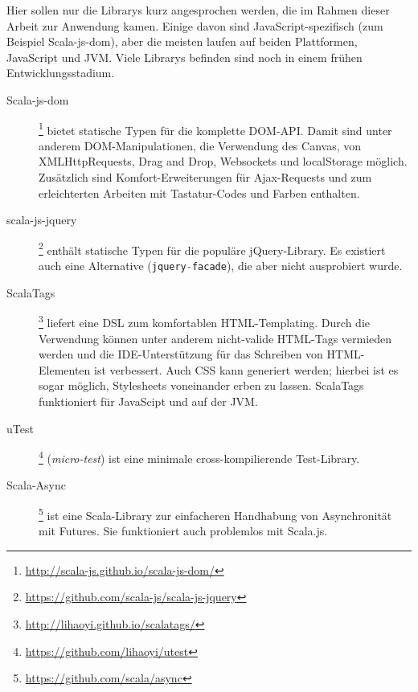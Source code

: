 \documentclass[a4paper, 12pt, hidelinks, listof=totoc, listoftables=totoc, bibliography=totoc]{scrreprt}
\newcommand{\code}[1]{\lstinline[language=Scala, style=inline]|#1|}
\begin{document}
Hier sollen nur die Librarys kurz angesprochen werden, die im Rahmen dieser Arbeit zur Anwendung kamen. Einige davon sind JavaScript-spezifisch (zum Beispiel Scala-js-dom), aber die meisten laufen auf beiden Plattformen, JavaScript und \ac{JVM}. Viele Librarys befinden sind noch in einem frühen Entwicklungsstadium.

\begin{description}
	\item[Scala-js-dom]\footnote{\url{http://scala-js.github.io/scala-js-dom/}} bietet statische Typen für die komplette \ac{DOM}-\ac{API}. Damit sind unter anderem DOM-Manipulationen, die Verwendung des Canvas, von XMLHttpRequests, Drag and Drop, Websockets und localStorage möglich. Zusätzlich sind Komfort-Erweiterungen für Ajax-Requests und zum erleichterten Arbeiten mit Tastatur-Codes und Farben enthalten.
	
	\item[scala-js-jquery]\footnote{\url{https://github.com/scala-js/scala-js-jquery}} enthält statische Typen für die populäre jQuery-Library. Es existiert auch eine Alternative (\code{jquery-facade}), die aber nicht ausprobiert wurde.
	
	\item[ScalaTags]\footnote{\url{http://lihaoyi.github.io/scalatags/}} liefert eine \ac{DSL} zum komfortablen \ac{HTML}-Templating. Durch die Verwendung können unter anderem nicht-valide \ac{HTML}-Tags vermieden werden und die \ac{IDE}-Unterstützung für das Schreiben von \ac{HTML}-Elementen ist verbessert. Auch \ac{CSS} kann generiert werden; hierbei ist es sogar möglich, Stylesheets voneinander erben zu lassen. ScalaTags funktioniert für JavaScipt und auf der \ac{JVM}.

	\item[uTest]\footnote{\url{https://github.com/lihaoyi/utest}} (\emph{micro-test}) ist eine minimale cross-kompilierende Test-Library.
	
	\item[Scala-Async]\footnote{\url{https://github.com/scala/async}} ist eine Scala-Library zur einfacheren Handhabung von Asynchronität mit Futures. Sie funktioniert auch problemlos mit Scala.js.
%	
%	
\end{description}
\end{document}
